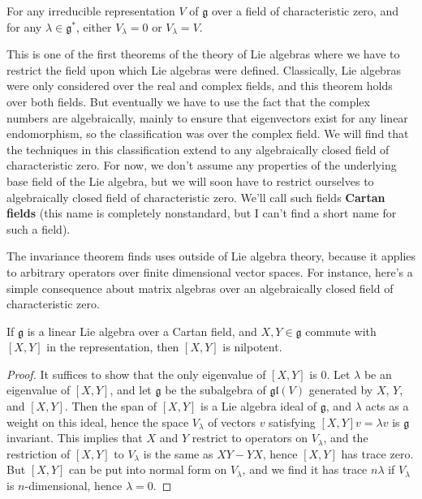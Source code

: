 \begin{corollary}
    For any irreducible representation $V$ of $\mathfrak{g}$ over a field of characteristic zero, and for any $\lambda \in \mathfrak{g}^*$, either $V_\lambda = 0$ or $V_\lambda = V$.
\end{corollary}

This is one of the first theorems of the theory of Lie algebras where we have to restrict the field upon which Lie algebras were defined. Classically, Lie algebras were only considered over the real and complex fields, and this theorem holds over both fields. But eventually we have to use the fact that the complex numbers are algebraically, mainly to ensure that eigenvectors exist for any linear endomorphism, so the classification was over the complex field. We will find that the techniques in this classification extend to any algebraically closed field of characteristic zero. For now, we don't assume any properties of the underlying base field of the Lie algebra, but we will soon have to restrict ourselves to algebraically closed field of characteristic zero. We'll call such fields {\bf Cartan fields} (this name is completely nonstandard, but I can't find a short name for such a field).

The invariance theorem finds uses outside of Lie algebra theory, because it applies to arbitrary operators over finite dimensional vector spaces. For instance, here's a simple consequence about matrix algebras over an algebraically closed field of characteristic zero.

\begin{theorem}
    If $\mathfrak{g}$ is a linear Lie algebra over a Cartan field, and $X, Y \in \mathfrak{g}$ commute with $[X,Y]$ in the representation, then $[X,Y]$ is nilpotent.
\end{theorem}
\begin{proof}
    It suffices to show that the only eigenvalue of $[X,Y]$ is 0. Let $\lambda$ be an eigenvalue of $[X,Y]$, and let $\mathfrak{g}$ be the subalgebra of $\mathfrak{gl}(V)$ generated by $X$, $Y$, and $[X,Y]$. Then the span of $[X,Y]$ is a Lie algebra ideal of $\mathfrak{g}$, and $\lambda$ acts as a weight on this ideal, hence the space $V_\lambda$ of vectors $v$ satisfying $[X,Y]v = \lambda v$ is $\mathfrak{g}$ invariant. This implies that $X$ and $Y$ restrict to operators on $V_\lambda$, and the restriction of $[X,Y]$ to $V_\lambda$ is the same as $XY - YX$, hence $[X,Y]$ has trace zero. But $[X,Y]$ can be put into normal form on $V_\lambda$, and we find it has trace $n \lambda$ if $V_\lambda$ is $n$-dimensional, hence $\lambda = 0$.
\end{proof}

